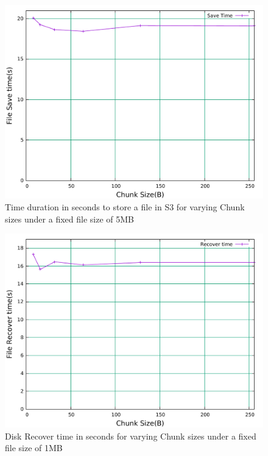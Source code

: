 \begin{figure}[h]
\centering
\includegraphics[width=\linewidth]{figures/RAIDStoreTimeChuckSize5Mb.pdf}
\caption{Time duration in seconds to store a file in S3 for varying Chunk sizes under a fixed file size of 5MB}
\label{fig:S3R6StrCHK5MB}
\end{figure}

\begin{figure}[h]
\includegraphics[width=\linewidth]{figures/RAIDRecoverTimeChuckSize1Mb.pdf}
\centering
\caption{Disk Recover time in seconds for varying Chunk sizes under a fixed file size of 1MB}
\label{fig:S3R6RcvCHK1MB}
\end{figure}

